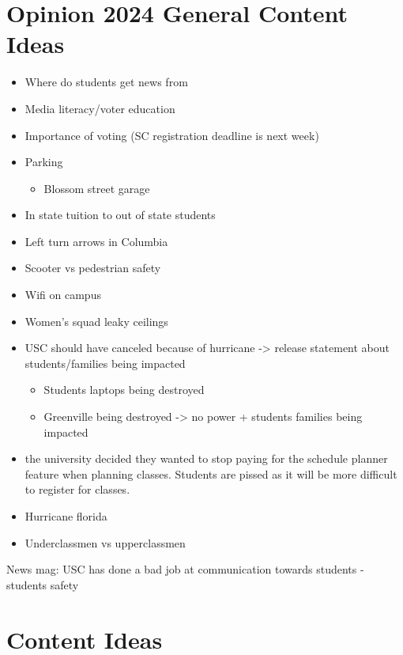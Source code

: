 \documentclass{article}
\begin{document}
\section*{Opinion 2024 General Content Ideas}

\begin{itemize}
\item
  Where do students get news from
\item
  Media literacy/voter education
\item
  Importance of voting (SC registration deadline is next week)
\item
  Parking~

  \begin{itemize}
  \item
    Blossom street garage
  \end{itemize}
\item
  In state tuition to out of state students
\item
  Left turn arrows in Columbia~
\item
  Scooter vs pedestrian safety~
\item
  Wifi on campus~
\item
  Women's squad leaky ceilings~
\item
  USC should have canceled because of hurricane -\textgreater{} release
  statement about students/families being impacted

  \begin{itemize}
  \item
    Students laptops being destroyed
  \item
    Greenville being destroyed -\textgreater{} no power + students
    families being impacted~
  \end{itemize}
\item
  the university decided they wanted to stop paying for the schedule
  planner feature when planning classes. Students are pissed as it will
  be more difficult to register for classes.~
\item
  Hurricane florida
\item
  Underclassmen vs upperclassmen
\end{itemize}

News mag: USC has done a bad job at communication towards students -
students safety~

\section*{Content Ideas}
\end{document}
